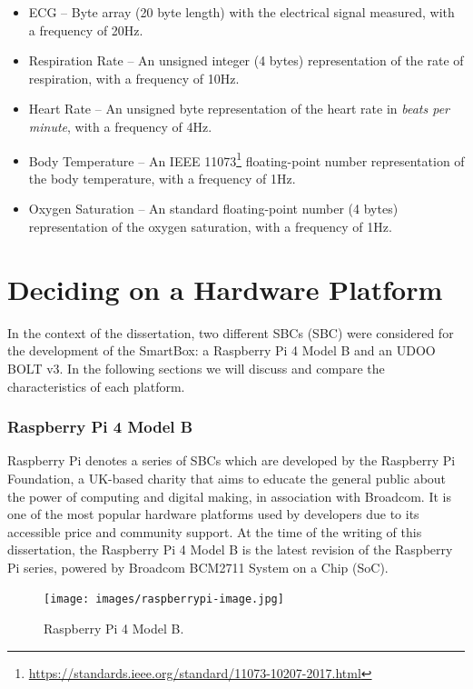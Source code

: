 \begin{itemize}
    \item \acf{ECG} -- Byte array (20 byte length) with the electrical signal measured, with a frequency of 20Hz.
    \item Respiration Rate -- An unsigned integer (4 bytes) representation of the rate of respiration, with a frequency of 10Hz.
    \item Heart Rate -- An unsigned byte representation of the heart rate in \textit{beats per minute}, with a frequency of 4Hz.
    \item Body Temperature -- An IEEE 11073\footnote{\url{https://standards.ieee.org/standard/11073-10207-2017.html}} floating-point number representation of the body temperature, with a frequency of 1Hz.
    \item Oxygen Saturation -- An standard floating-point number (4 bytes) representation of the oxygen saturation, with a frequency of 1Hz.
\end{itemize}


\section{Deciding on a Hardware Platform}

In the context of the dissertation, two different \acl{SBC}s (\acs{SBC}) were considered for the development of the SmartBox: a Raspberry Pi 4 Model B and an UDOO BOLT v3. In the following sections we will discuss and compare the characteristics of each platform. 

\subsubsection{Raspberry Pi 4 Model B}

Raspberry Pi denotes a series of \acs{SBC}s which are developed by the Raspberry Pi Foundation, a UK-based charity that aims to educate the general public about the power of computing and digital making, in association with Broadcom. It is one of the most popular hardware platforms used by developers due to its accessible price and community support.
At the time of the writing of this dissertation, the Raspberry Pi 4 Model B is the latest revision of the Raspberry Pi series, powered by Broadcom BCM2711 System on a Chip (SoC).

\begin{figure}[H]
    \centering
    \texttt{[image: images/raspberrypi-image.jpg]}
    \caption{Raspberry Pi 4 Model B.}
    \label{fig:raspberrypi-image}
\end{figure}

